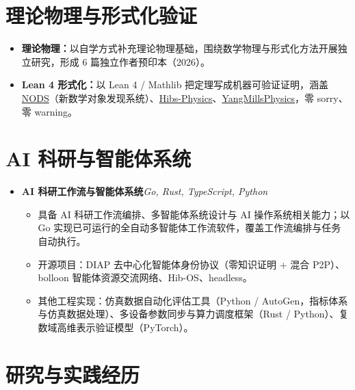 \documentclass[10pt,a4paper]{article}
\newcommand{\resumeItem}[1]{\item \small #1}
\begin{document}
\section{理论物理与形式化验证}

\begin{itemize}[leftmargin=0.15in, topsep=2pt]
\resumeItem{\textbf{理论物理：}以自学方式补充理论物理基础，围绕数学物理与形式化方法开展独立研究，形成 6 篇独立作者预印本（2026）。}
\resumeItem{\textbf{Lean 4 形式化：}以 Lean 4 / Mathlib 把定理写成机器可验证证明，涵盖 \href{https://github.com/logos-42/NODS}{NODS}（新数学对象发现系统）、\href{https://github.com/logos-42/Hibs-Physics}{Hibs-Physics}、\href{https://github.com/logos-42/YangMillsPhysics}{YangMillsPhysics}，零 sorry、零 warning。}
\end{itemize}

\newpage
\section{AI 科研与智能体系统}

\begin{itemize}[leftmargin=0.15in, label={}, topsep=2pt]
\item \textbf{AI 科研工作流与智能体系统}\hfill\textit{\small Go, Rust, TypeScript, Python}
\begin{itemize}[topsep=1pt, label=\textbullet]
\resumeItem{具备 AI 科研工作流编排、多智能体系统设计与 AI 操作系统相关能力；以 Go 实现已可运行的全自动多智能体工作流软件，覆盖工作流编排与任务自动执行。}
\resumeItem{开源项目：DIAP 去中心化智能体身份协议（零知识证明 + 混合 P2P）、bolloon 智能体资源交流网络、Hib-OS、headless。}
\resumeItem{其他工程实现：仿真数据自动化评估工具（Python / AutoGen，指标体系与仿真数据处理）、多设备参数同步与算力调度框架（Rust / Python）、复数域高维表示验证模型（PyTorch）。}
\end{itemize}
\end{itemize}

\section{研究与实践经历}
\end{document}
